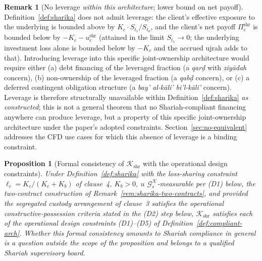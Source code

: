 \documentclass[preprint,12pt,authoryear]{elsarticle}
\newtheorem{proposition}{Proposition}[section]
\theoremstyle{definition}
\newtheorem{remark}{Remark}[section]
\begin{document}
\begin{remark}[No leverage \emph{within this architecture};
    lower bound on net payoff]
\label{rem:sharika-no-leverage}
Definition~\ref{def:sharika} does not admit leverage: the
client's effective exposure to the underlying is bounded above
by $K_c \cdot S_{t_1} / S_{t_0}$, and the client's net payoff
$\Pi^{\text{shr}}_c$ is bounded below by
$-K_c - u^{\text{shr}}_c$ (attained in the limit
$S_{t_1} \to 0$; the underlying investment loss alone is
bounded below by $-K_c$ and the accrued ujrah adds to that).
Introducing leverage into this specific joint-ownership
architecture would require either (a) debt financing of the
leveraged fraction (a \emph{qar\d{d}} with \emph{ziy\={a}dah}
concern), (b) non-ownership of the leveraged fraction (a
\emph{qab\d{d}} concern), or (c) a deferred contingent
obligation structure (a
\emph{bay' al-k\={a}li' bi'l-k\={a}li'} concern). Leverage is
therefore structurally unavailable within
Definition~\ref{def:sharika} \emph{as constructed}; this is not
a general theorem that no Shariah-compliant financing anywhere
can produce leverage, but a property of this specific
joint-ownership architecture under the paper's adopted
constraints. Section~\ref{sec:no-equivalent} addresses the CFD
use cases for which this absence of leverage is a binding
constraint.
\end{remark}

\begin{proposition}[Formal consistency of
    $\mathcal{K}_{\text{shr}}$ with the operational design
    constraints]
\label{prop:sharika-comply}
Under Definition~\ref{def:sharika} with the loss-sharing
constraint $\ell_c = K_c/(K_c+K_b)$ of clause~4, $K_b > 0$, $u$
$\mathcal{G}^{\mathcal{K}}_{s}$-measurable per (D1) below, the
two-contract construction of
Remark~\ref{rem:sharika-two-contracts}, and \emph{provided the
segregated custody arrangement of clause~3 satisfies the
operational constructive-possession criteria stated in the (D2)
step below}, $\mathcal{K}_{\text{shr}}$ satisfies each of the
operational design constraints (D1)--(D5) of
Definition~\ref{def:compliant-arch}. Whether this formal
consistency amounts to Shariah compliance in general is a
question outside the scope of the proposition and belongs to a
qualified Shariah supervisory board.
\end{proposition}
\end{document}
